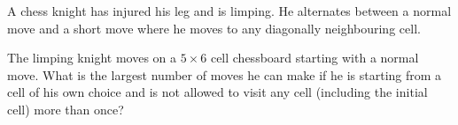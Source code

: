 A chess knight has injured his leg and is limping. He alternates between a normal move and a short move where he moves to any diagonally neighbouring cell.

The limping knight moves on a $5 \times 6$ cell chessboard starting with a normal move. What is the largest number of moves he can make if he is starting from a cell of his own choice and is not allowed to visit any cell (including the initial cell) more than once?